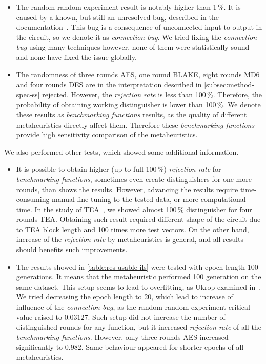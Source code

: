 \documentclass[
  print, %
  Table,   %
  nolof,     %
  nolot,     %
  11pt, %
  oneside  %
]{fithesis3}
\begin{document}
\begin{itemize}
    \item The random-random experiment result is notably higher than 1\,\%. It is caused by a known, but still an unresolved bug, described in the documentation~\cite{EACirc-wiki-bug}. This bug is a consequence of unconnected input to output in the circuit, so we denote it as \textit{connection bug}. We tried fixing the \textit{connection bug} using many techniques however, none of them were statistically sound and none have fixed the issue globally.
    \item The randomness of three rounds AES, one round BLAKE, eight rounds MD6 and four rounds DES are in the interpretation described in \cref{subsec:method-spec-ss} rejected. However, the \textit{rejection rate} is less than 100\,\%. Therefore, the probability of obtaining working distinguisher is lower than 100\,\%. We denote these results as \textit{benchmarking functions} results, as the quality of different metaheuristics directly affect them. Therefore these \textit{benchmarking functions} provide high sensitivity comparison of the metaheuristics.
\end{itemize}

We also performed other tests, which showed some additional information.

\begin{itemize}
    \item It is possible to obtain higher (up to full 100\,\%) \textit{rejection rate} for \textit{benchmarking functions}, sometimes even create distinguishers for one more rounds, than shows the results. However, advancing the results require time-consuming manual fine-tuning to the tested data, or more computational time. In the study of TEA~\cite{kubicek2016new}, we showed almost 100\,\% distinguisher for four rounds TEA. Obtaining such result required different shape of the circuit due to TEA block length and 100 times more test vectors. On the other hand, increase of the \textit{rejection rate} by metaheuristics is general, and all results should benefits such improvements.
    
    \item The results showed in \cref{table:res-usable-ils} were tested with epoch length 100 generations. It means that the metaheuristic performed 100 generation on the same dataset. This setup seems to lead to overfitting, as Ukrop examined in~\cite[section~7.1]{ukropBcThesis}. We tried decreasing the epoch length to 20, which lead to increase of influence of the \textit{connection bug}, as the random-random experiment critical value raised to $0.03127$. Such setup did not increase the number of distinguished rounds for any function, but it increased \textit{rejection rate} of all the \textit{benchmarking functions}. However, only three rounds AES increased significantly to $0.982$. Same behaviour appeared for shorter epochs of all metaheuristics.
\end{itemize}
\end{document}
